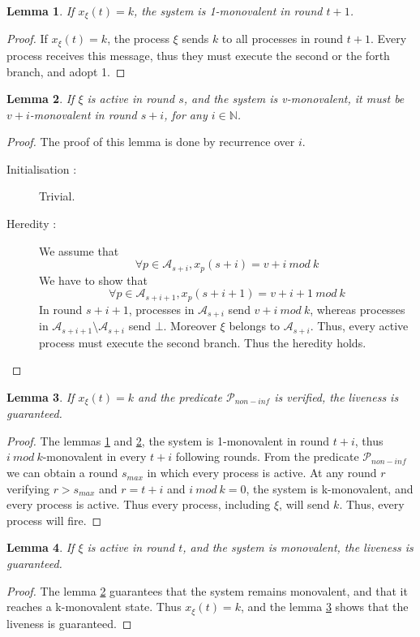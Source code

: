 \documentclass{article}
\newtheorem{lemma}{Lemma}[section]
\begin{document}
\begin{lemma}\label{lem:k_mono}
	If $x_\xi(t) = k$, the system is 1-monovalent in round $t+1$.
\end{lemma}
\begin{proof}
	If $x_\xi(t) = k$, the process $\xi$ sends $k$ to all processes in round $t+1$.
	Every process receives this message, thus they must execute the second or the forth branch, and adopt 1.
\end{proof}

\begin{lemma}\label{lem:mono_mono}
	If $\xi$ is active in round $s$, and the system is v-monovalent, it must be $v+i$-monovalent in round $s+i$,
	for any $i \in \mathds{N}$.
\end{lemma}
\begin{proof}
	The proof of this lemma is done by recurrence over $i$.
	\begin{description}
		\item[Initialisation :] Trivial.
		\item[Heredity :] We assume that
			$$\forall p \in \mathcal{A}_{s+i}, x_p(s+i) = v+i~mod~k$$
			We have to show that 
			$$\forall p \in \mathcal{A}_{s+i+1}, x_p(s+i+1) = v+i+1~mod~k$$
			In round $s+i+1$, processes in $\mathcal{A}_{s+i}$ send $v+i~mod~k$, whereas processes 
			in $\mathcal{A}_{s+i+1} \setminus \mathcal{A}_{s+i}$ send $\bot$.
			Moreover $\xi$ belongs to $\mathcal{A}_{s+i}$.
			Thus, every active process must execute the second branch.
			Thus the heredity holds.
	\end{description}
\end{proof}

\begin{lemma}\label{lem:k_liv}
	If $x_\xi(t) = k$ and the predicate $\mathcal{P}_{non-inf}$ is verified, the liveness is guaranteed.
\end{lemma}
\begin{proof}
	The lemmas \ref{lem:k_mono} and \ref{lem:mono_mono}, the system is 1-monovalent in round $t+i$,
	thus $i~mod~k$-monovalent in every $t+i$ following rounds.
	From the predicate $\mathcal{P}_{non-inf}$ we can obtain a round $s_{max}$ in which every process is active.
	At any round $r$ verifying $r > s_{max}$ and $r = t + i$ and $i~mod~k = 0$, the system is k-monovalent,
	and every process is active. Thus every process, including $\xi$, will send $k$.
	Thus, every process will fire.
\end{proof}

\begin{lemma}\label{lem:mono_liv}
	If $\xi$ is active in round $t$, and the system is monovalent, the liveness is guaranteed.
\end{lemma}
\begin{proof}
	The lemma \ref{lem:mono_mono} guarantees that the system remains monovalent, and that it reaches a
	k-monovalent state.
	Thus $x_\xi(t) = k$, and the lemma \ref{lem:k_liv} shows that the liveness is guaranteed.
\end{proof}
\end{document}
